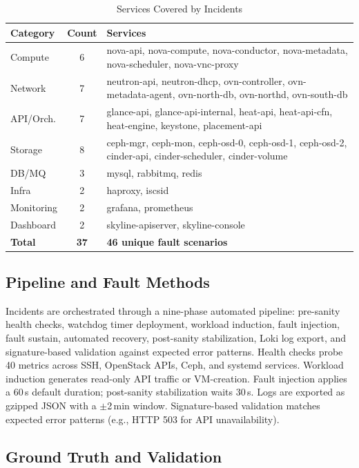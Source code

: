 \documentclass[sigconf,review]{acmart}
\begin{document}
\begin{table}[t]
\centering
\footnotesize
\caption{Services Covered by Incidents}
\label{tab:services}
\begin{tabular}{@{}lcp{4cm}@{}}
\toprule
\textbf{Category} & \textbf{Count} & \textbf{Services} \\
\midrule
Compute & 6 & nova-api, nova-compute, nova-conductor, nova-metadata, nova-scheduler, nova-vnc-proxy \\
Network & 7 & neutron-api, neutron-dhcp, ovn-controller, ovn-metadata-agent, ovn-north-db, ovn-northd, ovn-south-db \\
API/Orch. & 7 & glance-api, glance-api-internal, heat-api, heat-api-cfn, heat-engine, keystone, placement-api \\
Storage & 8 & ceph-mgr, ceph-mon, ceph-osd-0, ceph-osd-1, ceph-osd-2, cinder-api, cinder-scheduler, cinder-volume \\
DB/MQ & 3 & mysql, rabbitmq, redis \\
Infra & 2 & haproxy, iscsid \\
Monitoring & 2 & grafana, prometheus \\
Dashboard & 2 & skyline-apiserver, skyline-console \\
\midrule
\textbf{Total} & \textbf{37} & \textbf{46 unique fault scenarios} \\
\bottomrule
\end{tabular}
\end{table}

\subsection{Pipeline and Fault Methods}

Incidents are orchestrated through a nine-phase automated pipeline: pre-sanity health checks, watchdog timer deployment, workload induction, fault injection, fault sustain, automated recovery, post-sanity stabilization, Loki log export, and signature-based validation against expected error patterns. Health checks probe 40 metrics across SSH, OpenStack APIs, Ceph, and systemd services. Workload induction generates read-only API traffic or VM-creation. Fault injection applies a 60\,s default duration; post-sanity stabilization waits 30\,s. Logs are exported as gzipped JSON with a $\pm$2\,min window. Signature-based validation matches expected error patterns (e.g., HTTP 503 for API unavailability).

\subsection{Ground Truth and Validation}
\end{document}
